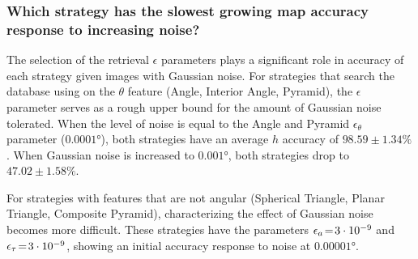 \begin{figure*}
\end{figure*}

\subsubsection{Which strategy has the slowest growing map accuracy response to increasing noise?}
The selection of the retrieval $\epsilon$ parameters plays a significant role in accuracy of each strategy given images with Gaussian noise.
For strategies that search the database using on the $\theta$ feature (Angle, Interior Angle, Pyramid), the $\epsilon$ parameter serves as a rough upper bound for the amount of Gaussian noise tolerated.
When the level of noise is equal to the Angle and Pyramid $\epsilon_\theta$ parameter ($\ang{0.0001}$), both strategies have an average $h$ accuracy of $98.59\!\pm\!1.34\%$.
When Gaussian noise is increased to $\ang{0.001}$, both strategies drop to $47.02\!\pm\!1.58\%$.

For strategies with features that are not angular (Spherical Triangle, Planar Triangle, Composite Pyramid), characterizing the effect of Gaussian noise becomes more difficult.
These strategies have the parameters $\epsilon_a \!=\! 3\cdot 10^{-9}$ and $\epsilon_\tau \!=\! 3\cdot10^{-9}$, showing an initial accuracy response to noise at $\ang{0.00001}$.

